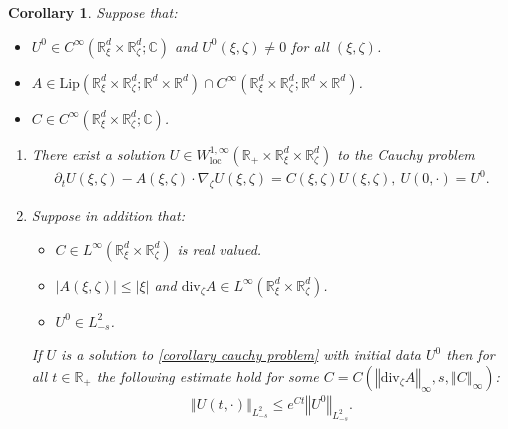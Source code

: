 \documentclass[11pt,reqno]{amsart}
\newtheorem{cor}[thm]{Corollary}
\numberwithin{equation}{section}
\begin{document}
\begin{cor}
Suppose that: 
\begin{itemize}
    \item $U^{0}\in C^{\infty}(\mathbb{R}^{d}_{\xi}\times \mathbb{R}_{\zeta}^{d};\mathbb{C})$ and $U^{0}(\xi,\zeta)\neq 0$ for all $(\xi,\zeta)$. 
    \item $A\in  \mathrm{Lip}(\mathbb{R}^{d}_{\xi}\times \mathbb{R}^{d}_{\zeta};\mathbb{R}^{d}\times \mathbb{R}^{d})\cap C^{\infty}(\mathbb{R}^{d}_{\xi}\times \mathbb{R}^{d}_{\zeta};\mathbb{R}^{d}\times \mathbb{R}^{d}) $.  
    \item $C\in C^{\infty}(\mathbb{R}^{d}_{\xi}\times \mathbb{R}^{d}_{\zeta};\mathbb{C})$. 
\end{itemize}
\begin{enumerate}
    \item  There exist a solution $U\in W^{1,\infty}_{\mathrm{loc}}(\mathbb{R}_{+}\times \mathbb{R}^{d}_{\xi}\times \mathbb{R}^{d}_{\zeta})$ to the Cauchy problem 
\begin{align}
\partial_{t}U(\xi,\zeta)-A(\xi,\zeta)\cdot \nabla_{\zeta}U(\xi,\zeta)=C(\xi,\zeta)U(\xi,\zeta),\ U(0,\cdot)=U^{\mathrm{0}}.  \label{corollary cauchy problem}    
\end{align}
\item Suppose in addition that: 
\begin{itemize}
\item $C\in L^{\infty}(\mathbb{R}^{d}_{\xi}\times \mathbb{R}^{d}_{\zeta})$ is real valued.
\item $\left\vert A(\xi,\zeta)\right\vert\leq \left\vert \xi\right\vert$ and $\mathrm{div}_{\zeta}A\in L^{\infty}(\mathbb{R}^{d}_{\xi}\times \mathbb{R}^{d}_{\zeta})$. 
\item $U^
{0}\in L^{2}_{-s}$. 
\end{itemize}
If $U$ is a solution to \eqref{corollary cauchy problem} with initial data $U^{0}$ then for all $t\in \mathbb{R}_{+}$ the following estimate hold for some $C=C(\left\Vert \mathrm{div}_{\zeta}A\right\Vert_{\infty},s,\left\Vert C\right\Vert_{\infty})$:  
\begin{align}
\left\Vert U(t,\cdot)\right\Vert_{L^{2}_{-s}} \leq e^{Ct}\left\Vert U^{0}\right\Vert_{L^{2}_{-s}}.      \label{L2s of U} 
\end{align}
\end{enumerate}
\label{linear transport well posed}
\end{cor}
\end{document}
